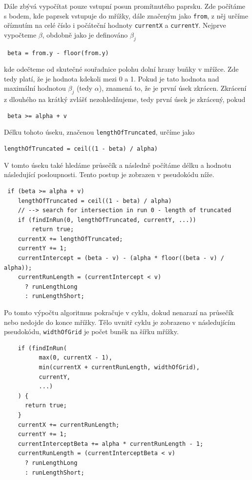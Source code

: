 \documentclass[report,11pt]{elsarticle}
\begin{document}
 
 Dále zbývá vypočítat pouze vstupní posun promítnutého paprsku. Zde počítáme s bodem, kde paprsek vstupuje do mřížky, dále značeným jako \verb|from|, z něj určíme oříznutím na celé číslo i počáteční hodnoty \verb|currentX| a \verb|currentY|. Nejprve vypočteme \(\beta\), obdobně jako je definováno \(\beta _{j}\)
 \begin{verbatim}
 beta = from.y - floor(from.y)
 \end{verbatim}
 kde odečteme od skutečné souřadnice polohu dolní hrany buňky v mřížce. Zde tedy platí, že je hodnota kdekoli mezi 0 a 1. Pokud je tato hodnota nad maximální hodnotou \(\beta _{j}\) (tedy \(\alpha\)), znamená to, že je první úsek zkrácen. Zkrácení z dlouhého na krátký zvlášť nezohledňujeme, tedy první úsek je zkrácený, pokud
 \begin{verbatim}
 beta >= alpha + v
 \end{verbatim}
 Délku tohoto úseku, značenou \verb|lengthOfTruncated|, určíme jako
 \begin{verbatim}lengthOfTruncated = ceil((1 - beta) / alpha)\end{verbatim}
 V tomto úseku také hledáme průsečík a následně počítáme délku a hodnotu následující posloupnosti. Tento postup je zobrazen v pseudokódu níže.
 
\begin{verbatim}
 if (beta >= alpha + v)
    lengthOfTruncated = ceil((1 - beta) / alpha)
    // --> search for intersection in run 0 - length of truncated
    if (findInRun(0, lengthOfTruncated, currentY, ...))
        return true;
    currentX += lengthOfTruncated;
    currentY += 1;
    currentIntercept = (beta - v) - (alpha * floor((beta - v) / alpha));
    currentRunLength = (currentIntercept < v)
      ? runLengthLong
      : runLengthShort;
\end{verbatim}
Po tomto výpočtu algoritmus pokračuje v cyklu, dokud nenarazí na průsečík nebo nedojde do konce mřížky. Tělo uvnitř cyklu je zobrazeno v následujícím pseudokódu, \verb|widthOfGrid| je počet buněk na šířku mřížky.

\begin{verbatim}
    if (findInRun(
          max(0, currentX - 1),
          min(currentX + currentRunLength, widthOfGrid),
          currentY,
          ...)
    ) {
      return true;
    }
    currentX += currentRunLength;
    currentY += 1;
    currentInterceptBeta += alpha * currentRunLength - 1;
    currentRunLength = (currentInterceptBeta < v)
      ? runLengthLong
      : runLengthShort;
\end{verbatim}
\end{document}
